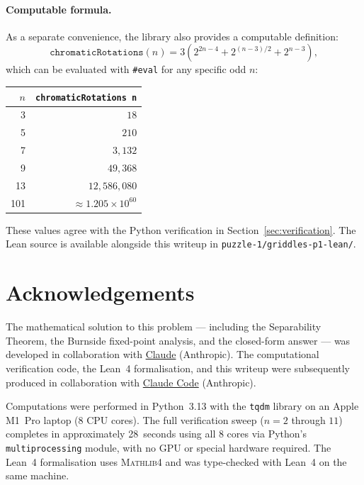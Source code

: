 \documentclass{article}
\begin{document}
\paragraph{Computable formula.}
As a separate convenience, the library also provides a
computable definition:
\[
  \mathtt{chromaticRotations}(n)
  = 3\!\left(2^{2n-4}+2^{(n-3)/2}+2^{n-3}\right),
\]
which can be evaluated with \texttt{\#eval} for any
specific odd $n$:

\begin{center}
\begin{tabular}{rr}
  \toprule
  $n$ & \texttt{chromaticRotations n} \\
  \midrule
   3 & $18$ \\
   5 & $210$ \\
   7 & $3{,}132$ \\
   9 & $49{,}368$ \\
  13 & $12{,}586{,}080$ \\
 101 & $\approx 1.205\times 10^{60}$ \\
  \bottomrule
\end{tabular}
\end{center}

\noindent
These values agree with the Python verification in
Section~\ref{sec:verification}.
The Lean source is available alongside this writeup in
\texttt{puzzle-1/griddles-p1-lean/}.

\section*{Acknowledgements}

The mathematical solution to this problem --- including the
Separability Theorem, the Burnside fixed-point analysis, and the
closed-form answer --- was developed in collaboration with
\href{https://claude.ai}{Claude} (Anthropic).
The computational verification code, the Lean~4 formalisation,
and this writeup were subsequently produced in collaboration with
\href{https://claude.ai/code}{Claude Code} (Anthropic).

Computations were performed in Python~3.13 with the
\texttt{tqdm} library on an Apple M1~Pro laptop (8 CPU cores).
The full verification sweep ($n = 2$ through $11$) completes in
approximately 28~seconds using all 8 cores via Python's
\texttt{multiprocessing} module, with no GPU or special
hardware required.
The Lean~4 formalisation uses \textsc{Mathlib4} and was
type-checked with Lean~4 on the same machine.
\end{document}

